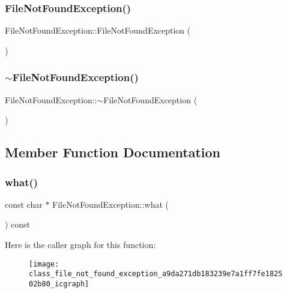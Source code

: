 \subsubsection{\texorpdfstring{FileNotFoundException()}{FileNotFoundException()}}
{\footnotesize\ttfamily File\+Not\+Found\+Exception\+::\+File\+Not\+Found\+Exception (\begin{DoxyParamCaption}{ }\end{DoxyParamCaption})}

\mbox{\label{class_file_not_found_exception_abd5d5c0ea4ac795741b20b0e4a9fb1ff}} 
\subsubsection{\texorpdfstring{$\sim$FileNotFoundException()}{~FileNotFoundException()}}
{\footnotesize\ttfamily File\+Not\+Found\+Exception\+::$\sim$\+File\+Not\+Found\+Exception (\begin{DoxyParamCaption}{ }\end{DoxyParamCaption})}



\subsection{Member Function Documentation}
\mbox{\label{class_file_not_found_exception_a9da271db183239e7a1ff7fe182502b80}} 
\subsubsection{\texorpdfstring{what()}{what()}}
{\footnotesize\ttfamily const char $\ast$ File\+Not\+Found\+Exception\+::what (\begin{DoxyParamCaption}{ }\end{DoxyParamCaption}) const\hspace{0.3cm}{\ttfamily [noexcept]}}

Here is the caller graph for this function\+:
\nopagebreak
\begin{figure}[H]
\begin{center}
\leavevmode
\texttt{[image: class\_file\_not\_found\_exception\_a9da271db183239e7a1ff7fe182502b80\_icgraph]}
\end{center}
\end{figure}


